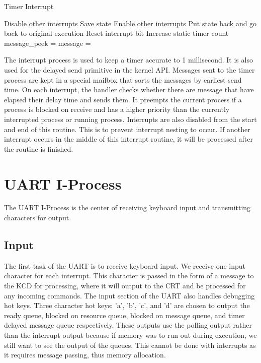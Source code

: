 \documentclass[12pt]{report}
\begin{document}
\begin{algorithm}
    \caption{Timer Interrupt}
    \begin{algorithmic}[1]
          \State Disable other interrupts
          \State Save state
          \State {}
          \State Enable other interrupts
          \State Put state back and go back to original execution
      \EndFunction
      \bigskip
          \State Reset interrupt bit
          \State Increase static timer count
          \State message\_peek = 
              \State message = 
              \State {}
              \State {}
          \EndIf
      \EndFunction
  \end{algorithmic}
\end{algorithm}
The interrupt process is used to keep a timer accurate to 1 millisecond. It is also used for the delayed send primitive in the kernel API. Messages sent to the timer process are kept in a special mailbox that sorts the messages by earliest send time. On each interrupt, the handler checks whether there are message that have elapsed their delay time and sends them. It preempts the current process if a process is blocked on receive and has a higher priority than the currently interrupted process or running process. Interrupts are also disabled from the start and end of this routine. This is to prevent interrupt nesting to occur. If another interrupt occurs in the middle of this interrupt routine, it will be processed after the routine is finished.

\section{UART I-Process}
The UART I-Process is the center of receiving keyboard input and transmitting characters for output.

\subsection{Input}
\label{sec:uart_input}
The first task of the UART is to receive keyboard input. We receive one input character for each interrupt. This character is passed in the form of a message to the KCD for processing, where it will output to the CRT and be processed for any incoming commands. The input section of the UART also handles debugging hot keys. Three character hot keys: 'a', 'b', 'c', and 'd' are chosen to output the ready queue, blocked on resource queue, blocked on message queue, and timer delayed message queue respectively. These outputs use the polling output rather than the interrupt output because if memory was to run out during execution, we still want to see the output of the queues. This cannot be done with interrupts as it requires message passing, thus memory allocation.
\end{document}
